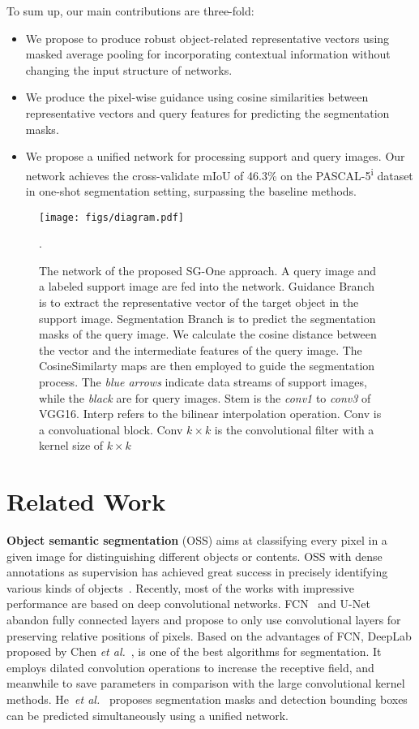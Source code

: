 \documentclass[journal]{IEEEtran}
\newcommand{\etal}{\emph{et al.}}
\begin{document}
To sum up, our main contributions are three-fold:
\begin{itemize}
\item We propose to produce robust object-related representative vectors using masked average pooling for incorporating contextual information without changing the input structure of networks.  
\item We produce the pixel-wise guidance using cosine similarities between representative vectors and query features for predicting the segmentation masks. 
\item We propose a unified network for processing support and query images. Our network achieves the cross-validate mIoU of 46.3\% on the PASCAL-5\textsuperscript{i} dataset in one-shot segmentation setting, surpassing the baseline methods.
\end{itemize}


\begin{figure*}[htp]
  \centering
  \texttt{[image: figs/diagram.pdf]}
  \caption{The network of the proposed SG-One approach. A query image and a labeled support image are fed into the network. Guidance Branch is to extract the representative vector of the target object in the support image. Segmentation Branch is to predict the segmentation masks of the query image. We calculate the cosine distance between the vector and the intermediate features of the query image. The CosineSimilarty maps are then employed to guide the segmentation process. 
  The \textit{blue arrows} indicate data streams of support images, while the \textit{black} are for query images.
  Stem is the \textit{conv1} to \textit{conv3} of VGG16. Interp refers to the bilinear interpolation operation. Conv is a convoluational block. Conv $k\times k$ is the convolutional filter with a kernel size of $k\times k$}.
  \label{fig-1}
\vspace{-3mm}
\end{figure*}
\section{Related Work}
\textbf{Object semantic segmentation} (OSS) aims at classifying every pixel in a given image for distinguishing different objects or contents. 
OSS with dense annotations as supervision has achieved great success in precisely identifying various kinds of objects~\cite{husain2014consistent,yang2014scale, peng2015high,nie20183,wang2018hybrid,ben2019coupled,cheng2019spgnet,huang2018ccnet}.
Recently, most of the works with impressive performance are based on deep convolutional networks. 
FCN~\cite{2015-long} and U-Net~\cite{ronneberger2015u} abandon fully connected layers and propose to only use convolutional layers for preserving relative positions of pixels.
Based on the advantages of FCN, DeepLab proposed by Chen \etal~\cite{chen2014semantic,chen2018encoder}, is one of the best algorithms for segmentation.
It employs dilated convolution operations to increase the receptive field, and meanwhile to save parameters in comparison with the large convolutional kernel methods.
He~\etal~\cite{he2017mask} proposes segmentation masks and detection bounding boxes can be predicted simultaneously using a unified network.
\end{document}
